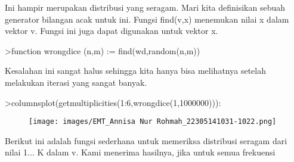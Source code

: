 \documentclass[a4paper,10pt]{article}
\begin{document}
\begin{eulernotebook}
\begin{eulercomment}
\begin{eulercomment}
\begin{eulercomment}
\begin{eulercomment}
\begin{eulercomment}
Ini hampir merupakan distribusi yang seragam. Mari kita definisikan
sebuah generator bilangan acak untuk ini. Fungsi find(v,x) menemukan
nilai x dalam vektor v. Fungsi ini juga dapat digunakan untuk vektor
x.
\end{eulercomment}
\begin{eulerprompt}
>function wrongdice (n,m) := find(wd,random(n,m))
\end{eulerprompt}
\begin{eulercomment}
Kesalahan ini sangat halus sehingga kita hanya bisa melihatnya setelah
melakukan iterasi yang sangat banyak.
\end{eulercomment}
\begin{eulerprompt}
>columnsplot(getmultiplicities(1:6,wrongdice(1,1000000))):
\end{eulerprompt}
\begin{figure}[h]
    \centering
    \texttt{[image: images/EMT\_Annisa Nur Rohmah\_22305141031-1022.png]}
\end{figure}
\begin{eulercomment}
Berikut ini adalah fungsi sederhana untuk memeriksa distribusi seragam
dari nilai 1... K dalam v. Kami menerima hasilnya, jika untuk semua
frekuensi


\end{eulercomment}
\end{eulercomment}
\end{eulercomment}
\end{eulercomment}
\end{eulercomment}
\end{eulernotebook}
\end{document}
